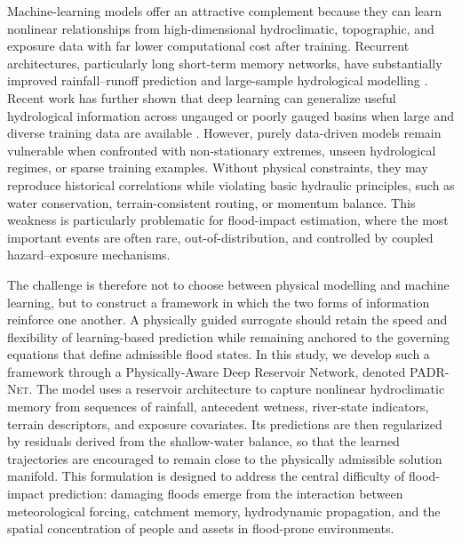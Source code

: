 \documentclass[pdflatex,sn-mathphys-ay]{sn-jnl}
\theoremstyle{thmstyleone}
\theoremstyle{thmstylethree}
\theoremstyle{thmstyletwo}
\begin{document}
Machine-learning models offer an attractive complement because they can
learn nonlinear relationships from high-dimensional hydroclimatic,
topographic, and exposure data with far lower computational cost after
training.  Recurrent architectures, particularly long short-term memory
networks, have substantially improved rainfall--runoff prediction and
large-sample hydrological modelling \citep{Hochreiter1997,Kratzert2019}.
Recent work has further shown that deep learning can generalize useful
hydrological information across ungauged or poorly gauged basins when
large and diverse training data are available \citep{Nearing2024}.
However, purely data-driven models remain vulnerable when confronted
with non-stationary extremes, unseen hydrological regimes, or sparse
training examples.  Without physical constraints, they may reproduce
historical correlations while violating basic hydraulic principles,
such as water conservation, terrain-consistent routing, or momentum
balance.  This weakness is particularly problematic for flood-impact
estimation, where the most important events are often rare,
out-of-distribution, and controlled by coupled hazard--exposure
mechanisms.

The challenge is therefore not to choose between physical modelling and
machine learning, but to construct a framework in which the two forms
of information reinforce one another.  A physically guided surrogate
should retain the speed and flexibility of learning-based prediction
while remaining anchored to the governing equations that define
admissible flood states.  In this study, we develop such a framework
through a Physically-Aware Deep Reservoir Network, denoted
\textsc{PADR-Net}.  The model uses a reservoir architecture to capture
nonlinear hydroclimatic memory from sequences of rainfall, antecedent
wetness, river-state indicators, terrain descriptors, and exposure
covariates.  Its predictions are then regularized by residuals derived
from the shallow-water balance, so that the learned trajectories are
encouraged to remain close to the physically admissible solution
manifold.  This formulation is designed to address the central
difficulty of flood-impact prediction: damaging floods emerge from the
interaction between meteorological forcing, catchment memory,
hydrodynamic propagation, and the spatial concentration of people and
assets in flood-prone environments.
\end{document}
